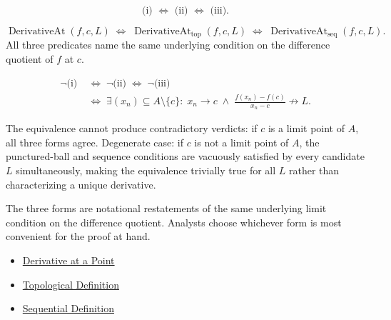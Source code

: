 \begin{remark*}
\[
\text{(i) } \Longleftrightarrow \text{ (ii) } \Longleftrightarrow \text{ (iii).}
\]
\end{remark*}

\begin{remark*}
\[
\operatorname{DerivativeAt}(f,c,L)
\;\Longleftrightarrow\;
\operatorname{DerivativeAt}_{\mathrm{top}}(f,c,L)
\;\Longleftrightarrow\;
\operatorname{DerivativeAt}_{\mathrm{seq}}(f,c,L).
\]
All three predicates name the same underlying condition on the difference quotient of $f$ at $c$.
\end{remark*}

\begin{remark*}
\[
\begin{aligned}
\neg\text{(i)} &\;\Longleftrightarrow\; \neg\text{(ii)} \;\Longleftrightarrow\; \neg\text{(iii)}\\
&\;\Longleftrightarrow\; \exists (x_n) \subseteq A \setminus \{c\}:\;
x_n \to c \;\land\; \frac{f(x_n)-f(c)}{x_n-c} \not\to L.
\end{aligned}
\]
\end{remark*}

\begin{remark*}
The equivalence cannot produce contradictory verdicts: if $c$ is a limit point of $A$, all three forms agree. Degenerate case: if $c$ is not a limit point of $A$, the punctured-ball and sequence conditions are vacuously satisfied by every candidate $L$ simultaneously, making the equivalence trivially true for all $L$ rather than characterizing a unique derivative.
\end{remark*}

\begin{remark*}[Interpretation]
The three forms are notational restatements of the same underlying limit condition on the difference quotient. Analysts choose whichever form is most convenient for the proof at hand.
\end{remark*}

\begin{dependencies}
\begin{itemize}
  \item \hyperref[def:derivative-at-a-point]{Derivative at a Point}
  \item \hyperref[def:topological-definition-of-derivative-at-a-point]{Topological Definition}
  \item \hyperref[def:sequential-definition-of-derivative-at-a-point]{Sequential Definition}
\end{itemize}
\end{dependencies}

